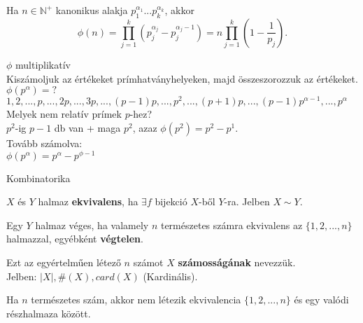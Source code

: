 \begin{frame}
  \begin{tcolorbox}[title={Tétel: ${\phi}$(n) kiszámolása}]
    Ha $n \in \mathbb{N}^+$ kanonikus alakja $p_1^{{\alpha}_1}...p_k^{{\alpha}_k}$, akkor\\
    $${\phi}(n) = \prod^k_{j=1} (p_j^{{\alpha}_j} - p_j^{{\alpha}_j - 1}) = n \prod^k_{j=1} (1 - \frac{1}{p_j}).$$
  \end{tcolorbox}

  \begin{tcolorbox}[title={Bizonyítás}]
    $\phi$ multiplikatív\\
    Kiszámoljuk az értékeket prímhatványhelyeken, majd összeszorozzuk az értékeket.\\
    ${\phi}(p^{\alpha}) = ?$\\
    $1, 2, ..., p, ..., 2p, ..., 3p, ..., (p-1)p, ..., p^2, ..., (p+1)p, ..., (p-1)p^{{\alpha}-1}, ..., p^{\alpha}$\\
    Melyek nem relatív prímek $p$-hez?\\
    \smallskip
    $p^2$-ig $p - 1$ db van + maga $p^2$, azaz ${\phi}(p^2) = p^2 - p^1$.\\
    Tovább számolva:\\
    ${\phi}(p^{\alpha}) = p^{\alpha} - p^{\phi - 1}$
  \end{tcolorbox}
\end{frame}

\begin{frame}[plain]
  \begin{tcolorbox}[center, colback={myyellow}, coltext={black}, colframe={myyellow}]
      {\Huge Kombinatorika}
      \mmedskip
  \end{tcolorbox}
\end{frame}


\begin{frame}
  \begin{tcolorbox}[title={Def.: Halmazok ekvivalenciája}]
    $X$ és $Y$ halmaz \textbf{ekvivalens}, ha ${\exists} f$ bijekció $X$-ből $Y$-ra. Jelben $X \sim Y$.\\
    \mmedskip

    Egy $Y$ halmaz véges, ha valamely $n$ természetes számra ekvivalens az $\{ 1, 2, ..., n \}$ halmazzal, egyébként \textbf{végtelen}.\\
    \mmedskip

    Ezt az egyértelműen létező $n$ számot $X$ \textbf{számosságának} nevezzük.\\
    Jelben: $|X|, \#(X), card(X)$ (Kardinális).
  \end{tcolorbox}

  \begin{tcolorbox}[title={Tétel: Véges halmaz valódi részhalmaza}]
    Ha $n$ természetes szám, akkor nem létezik ekvivalencia $\{ 1, 2, ..., n \}$ és egy valódi részhalmaza között.
  \end{tcolorbox}
\end{frame}

